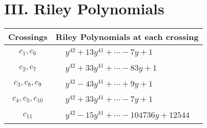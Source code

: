 \documentclass[1p]{elsarticle_modified}
\theoremstyle{definition}
\begin{document}
\centering \section*{ III. Riley Polynomials}
\begin{tabular}{m{50pt}|m{274pt}}
Crossings & \hspace{64pt}Riley Polynomials at each crossing \\
\hline $$\begin{aligned}c_{1},c_{6}\end{aligned}$$&$\begin{aligned}
&y^{42}+13 y^{41}+\cdots-7 y+1
\end{aligned}$\\
\hline $$\begin{aligned}c_{2},c_{7}\end{aligned}$$&$\begin{aligned}
&y^{42}+33 y^{41}+\cdots-83 y+1
\end{aligned}$\\
\hline $$\begin{aligned}c_{3},c_{8},c_{9}\end{aligned}$$&$\begin{aligned}
&y^{42}-43 y^{41}+\cdots+9 y+1
\end{aligned}$\\
\hline $$\begin{aligned}c_{4},c_{5},c_{10}\end{aligned}$$&$\begin{aligned}
&y^{42}+33 y^{41}+\cdots-7 y+1
\end{aligned}$\\
\hline $$\begin{aligned}c_{11}\end{aligned}$$&$\begin{aligned}
&y^{42}-15 y^{41}+\cdots-104736 y+12544
\end{aligned}$\\
\hline
\end{tabular}
\vskip 2pc
\end{document}

